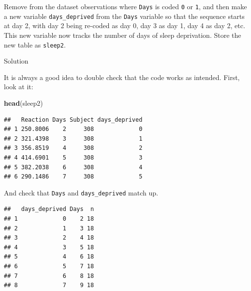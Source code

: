 \documentclass[]{book}
\newenvironment{Shaded}{\begin{snugshade}}{\end{snugshade}}
\newcommand{\DataTypeTok}[1]{\textcolor[rgb]{0.13,0.29,0.53}{#1}}
\newcommand{\KeywordTok}[1]{\textcolor[rgb]{0.13,0.29,0.53}{\textbf{#1}}}
\newcommand{\NormalTok}[1]{#1}
\newcommand{\OperatorTok}[1]{\textcolor[rgb]{0.81,0.36,0.00}{\textbf{#1}}}
\newcommand{\StringTok}[1]{\textcolor[rgb]{0.31,0.60,0.02}{#1}}
\begin{document}
Remove from the dataset observations where \texttt{Days} is coded \texttt{0} or \texttt{1}, and then make a new variable \texttt{days\_deprived} from the \texttt{Days} variable so that the sequence starts at day 2, with day 2 being re-coded as day 0, day 3 as day 1, day 4 as day 2, etc. This new variable now tracks the number of days of sleep deprivation. Store the new table as \texttt{sleep2}.

Solution

\begin{Shaded}
\end{Shaded}

It is always a good idea to double check that the code works as intended. First, look at it:

\begin{Shaded}
\begin{Highlighting}[]
\KeywordTok{head}\NormalTok{(sleep2)}
\end{Highlighting}
\end{Shaded}

\begin{verbatim}
##   Reaction Days Subject days_deprived
## 1 250.8006    2     308             0
## 2 321.4398    3     308             1
## 3 356.8519    4     308             2
## 4 414.6901    5     308             3
## 5 382.2038    6     308             4
## 6 290.1486    7     308             5
\end{verbatim}

And check that \texttt{Days} and \texttt{days\_deprived} match up.

\begin{Shaded}
\end{Shaded}

\begin{verbatim}
##   days_deprived Days  n
## 1             0    2 18
## 2             1    3 18
## 3             2    4 18
## 4             3    5 18
## 5             4    6 18
## 6             5    7 18
## 7             6    8 18
## 8             7    9 18
\end{verbatim}
\end{document}
